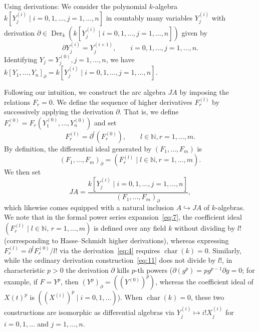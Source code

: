 \documentclass[a4paper, 12pt]{amsart}
\theoremstyle{remark}
\begin{document}
Using derivations: We consider the polynomial $k$-algebra $k[Y^{(i)}_j \mid i = 0, 1, \dots, j = 1, \dots, n]$ in countably many variables $Y^{(i)}_j$ with derivation $\partial \in \operatorname{Der}_k(k[Y^{(i)}_j \mid i = 0, 1, \dots, j = 1, \dots, n])$ given by
\begin{equation}
  \label{eq:10}
  \partial Y^{(i)}_j = Y^{(i + 1)}_j, \qquad i = 0, 1, \dots, j = 1, \dots, n.
\end{equation}
Identifying $Y_j = Y^{(0)}_j, j = 1, \dots, n$, we have $k[Y_1, \dots, Y_n]_\partial = k[Y^{(i)}_j \mid i = 0, 1, \dots, j = 1, \dots, n]$.

Following our intuition, we construct the arc algebra $J A$ by imposing the relations $F_r = 0$.
We define the sequence of higher derivatives $F_r^{(l)}$ by successively applying the derivation $\partial$.
That is, we define $F_r^{(0)} = F_r(Y^{(0)}_1, \dots, Y^{(0)}_n)$ and set
\begin{equation*}
  F_r^{(l)} = \partial^l(F_r^{(0)}), \qquad l \in \mathbb{N}, r = 1, \dots, m.
\end{equation*}
By definition, the differential ideal generated by $(F_1, \dots, F_m)$ is
\begin{equation*}
  (F_1, \dots, F_m)_\partial = (F^{(l)}_r \mid l \in \mathbb{N}, r = 1, \dots, m).
\end{equation*}
We then set
\begin{equation}
  \label{eq:11}
  J A = \frac{k[Y^{(i)}_j \mid i = 0, 1, \dots, j = 1, \dots, n]}{(F_1, \dots, F_m)_\partial},
\end{equation}
which likewise comes equipped with a natural inclusion $A \hookrightarrow J A$ of $k$-algebras.
We note that in the formal power series expansion~\eqref{eq:7},
the coefficient ideal $(F_r^{(l)} \mid l \in \mathbb{N}, \, r = 1, \dots, m)$ is defined over any field $k$ without dividing by $l!$
(corresponding to Hasse--Schmidt higher derivations),
whereas expressing $F_r^{(l)} = \partial^l F_r^{(0)} / l!$ via the derivation~\eqref{eq:4} requires $\operatorname{char}(k) = 0$.
Similarly,
while the ordinary derivation construction~\eqref{eq:11} does not divide by $l!$,
in characteristic $p > 0$ the derivation $\partial$ kills $p$-th powers ($\partial(g^p) = p g^{p - 1}\partial g = 0$;
for example, if $F = Y^p$, then $(Y^p)_\partial = ((Y^{(0)})^p)$, whereas the coefficient ideal of $X(t)^p$ is $((X^{(i)})^p \mid i = 0, 1, \dots)$).
When $\operatorname{char}(k) = 0$,
these two constructions are isomorphic as differential algebras via $Y_j^{(i)} \mapsto i!X^{(i)}_j$ for $i = 0, 1, \dots$ and $j = 1, \dots, n$.
\end{document}
